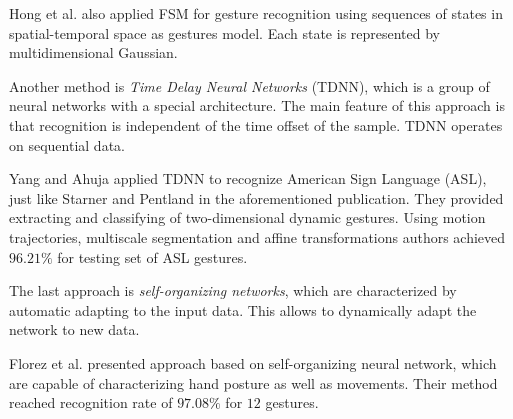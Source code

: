 Hong et al. \cite{Hong00constructingfinite} also applied FSM for gesture recognition using sequences of states in spatial-temporal space as gestures model. Each state is represented by multidimensional Gaussian.

Another method is \emph{Time Delay Neural Networks} (TDNN), which is a group of neural networks with a special architecture. The main feature of this approach is that recognition is independent of the time offset of the sample. TDNN operates on sequential data.

Yang and Ahuja \cite{YangAhujaComputerVision} applied TDNN to recognize American Sign Language (ASL), just like Starner and Pentland in the aforementioned publication. They provided extracting and classifying of two-dimensional dynamic gestures. Using motion trajectories, multiscale segmentation and affine transformations authors achieved $96.21\%$ for testing set of ASL gestures.

The last approach is \emph{self-organizing networks}, which are characterized by automatic adapting to the input data. This allows to dynamically adapt the network to new data.

Florez et al. \cite{Florez:2002:HGR:874061.875461} presented approach based on self-organizing neural network, which are capable of characterizing hand posture as well as movements. Their method reached recognition rate of $97.08\%$ for $12$ gestures.